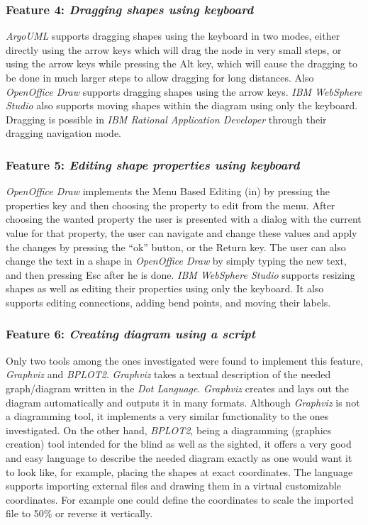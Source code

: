 \subsubsection {Feature 4: {\em Dragging shapes using keyboard}} 
{\em ArgoUML} supports dragging shapes using the keyboard in two modes, either directly using the arrow keys which will drag the node in very small steps, or using the arrow keys while pressing the Alt key, which will cause the dragging to be done in much larger steps to allow dragging for long distances. Also {\em OpenOffice Draw} supports dragging shapes using the arrow keys. {\em IBM WebSphere Studio} also supports moving shapes within the diagram using only the keyboard. Dragging is possible in {\em IBM Rational Application Developer} through their dragging navigation mode.

\subsubsection {Feature 5: {\em Editing shape properties using keyboard}} 
{\em OpenOffice Draw} implements the Menu Based Editing (in) by pressing the properties key and then choosing the property to edit from the menu. After choosing the wanted property the user is presented with a dialog with the current value for that property, the user can navigate and change these values and apply the changes by pressing the ``ok'' button, or the Return key. The user can also change the text in a shape in {\em OpenOffice Draw} by simply typing the new text, and then pressing Esc after he is done. {\em IBM WebSphere Studio} supports resizing shapes as well as editing their properties using only the keyboard. It also supports editing connections, adding bend points, and moving their labels.

\subsubsection {Feature 6: {\em Creating diagram using a script}} 
Only two tools among the ones investigated were found to implement this feature, {\em Graphviz} and {\em BPLOT2}. {\em Graphviz} takes a textual description of the needed graph/diagram written in the {\em Dot Language}\cite{dot_lang}. {\em Graphviz} creates and lays out the diagram automatically and outputs it in many formats. Although {\em Graphviz} is not a diagramming tool, it implements a very similar functionality to the ones investigated. On the other hand, {\em BPLOT2}, being a diagramming (graphics creation) tool intended for the blind as well as the sighted, it offers a very good and easy language to describe the needed diagram exactly as one would want it to look like, for example, placing the shapes at exact coordinates. The language supports importing external files and drawing them in a virtual customizable coordinates. For example one could define the coordinates to scale the imported file to 50\% or reverse it vertically.



